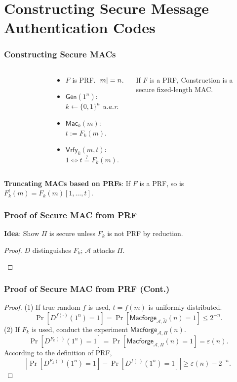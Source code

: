 \section{Constructing Secure Message Authentication Codes}
\begin{frame}\frametitle{Constructing Secure MACs}
\begin{columns}[C]
\begin{figure}
\begin{center}

\end{center}
\end{figure}
\begin{construction}
\begin{itemize}
\item $F$ is PRF. $\lvert m\rvert = n$.
\item $\mathsf{Gen}(1^n)$: $k \gets \{0,1\}^n$ \emph{u.a.r}.
\item $\mathsf{Mac}_k(m)$: $t := F_k(m)$.
\item $\mathsf{Vrfy}_k(m,t)$: $1 \iff t \overset{?}{=} F_k(m)$.
\end{itemize}
\end{construction}
\begin{theorem}\label{thm:mac}
If $F$ is a PRF, Construction is a secure fixed-length MAC.
\end{theorem}
\end{columns}
\begin{lemma}
\textbf{Truncating MACs based on PRFs}:
If $F$ is a PRF, so is $F^t_k(m) = F_k(m)[1,\dots,t]$.
\end{lemma}
\end{frame}
\begin{frame}\frametitle{Proof of Secure MAC from PRF}
\textbf{Idea}: Show $\Pi$ is secure unless $F_k$ is not PRF by reduction.  
\begin{proof}
$D$ distinguishes $F_k$; $\mathcal{A}$ attacks $\Pi$. 
\begin{figure}
\begin{center}

\end{center}
\end{figure}
\end{proof}
\end{frame}
\begin{frame}\frametitle{Proof of Secure MAC from PRF (Cont.)}
\begin{proof}
(1) If true random $f$ is used, $t=f(m)$ is uniformly distributed.
\[ \Pr[D^{f(\cdot)}(1^n)=1] = \Pr[\mathsf{Macforge}_{\mathcal{A},\tilde{\Pi}}(n) = 1] \le 2^{-n}.\]
(2) If $F_k$ is used, conduct the experiment $\mathsf{Macforge}_{\mathcal{A},\Pi}(n)$. 
\[ \Pr[D^{F_k(\cdot)}(1^n)=1] = \Pr[\mathsf{Macforge}_{\mathcal{A},\Pi}(n) = 1] = \varepsilon(n).\]
According to the definition of PRF,
\[ \left| \Pr[D^{F_k(\cdot)}(1^n)=1] - \Pr[D^{f(\cdot)}(1^n)=1] \right| \ge \varepsilon(n) - 2^{-n}. \]
\end{proof}
\end{frame}
